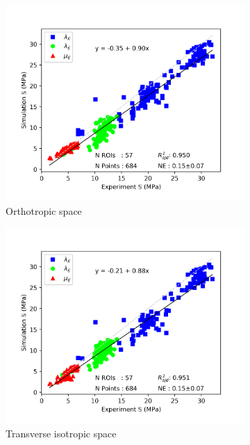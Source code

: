 \documentclass[a4paper,fleqn]{DC_ArtStyle}
\begin{document}
	\begin{figure}[!h]
		\centering
		\begin{subfigure}[t]{.3\linewidth}
		\includegraphics[height=0.8\linewidth]{../Results/ExpSim_S_Raw}
		\caption{Orthotropic space}
		\end{subfigure}
		\begin{subfigure}[t]{.3\linewidth}
		\includegraphics[height=0.8\linewidth]{../Results/ExpSim_S_Proj}
		\caption{Transverse isotropic space}
		\end{subfigure}
		\begin{subfigure}[t]{.3\linewidth}

\end{subfigure}
\end{figure}
\end{document}

